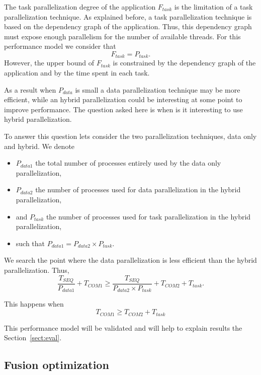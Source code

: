 The task parallelization degree of the application $F_{task}$ is the limitation of a task parallelization technique. As explained before, a task parallelization technique is based on the dependency graph of the application. Thus, this dependency graph must expose enough parallelism for the number of available threads. For this performance model we consider that 
\begin{equation*}
F_{task} = P_{task}.
\end{equation*}
However, the upper bound of $F_{task}$ is constrained by the dependency graph of the application and by the time spent in each task.

\medskip
As a result when $P_{data}$ is small a data parallelization technique may be more efficient, while an hybrid parallelization could be interesting at some point to improve performance. The question asked here is when is it interesting to use hybrid parallelization.

To answer this question lets consider the two parallelization techniques, data only and hybrid. We denote
\begin{itemize}
\item $P_{data1}$ the total number of processes entirely used by the data only parallelization,
\item $P_{data2}$ the number of processes used for data parallelization in the hybrid parallelization,
\item and $P_{task}$ the number of processes used for task parallelization in the hybrid parallelization,
\item such that $P_{data1} = P_{data2} \times P_{task}$.
\end{itemize}

We search the point where the data parallelization is less efficient than the hybrid parallelization. Thus, 
\begin{equation*}
\frac{T_{SEQ}}{P_{data1}} + T_{COM1} \geq \frac{T_{SEQ}}{P_{data2} \times P_{task}} + T_{COM2} + T_{task}.
\end{equation*}

This happens when
\begin{equation}
T_{COM1} \geq T_{COM2} + T_{task}
\label{eq:hyb}
\end{equation}

This performance model will be validated and will help to explain results the Section~\ref{sect:eval}.

\subsection{Fusion optimization}
\label{sect:fusion}

